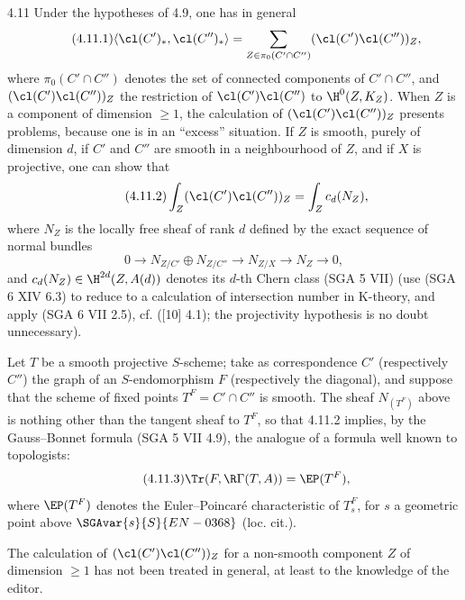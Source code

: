 \begin{statement}{4.11}
Under the hypotheses of 4.9, one has in general
\begin{equation}
\tag{4.11.1}
\langle \cl(C')_*,\cl(C'')_*\rangle
=
\sum_{Z\in\pi_0(C'\cap C'')}(\cl(C')\cl(C''))_Z,
\end{equation}
where $\pi_0(C'\cap C'')$ denotes the set of connected components of $C'\cap C''$, and $(\cl(C')\cl(C''))_Z$ the restriction of $\cl(C')\cl(C'')$ to $\H^0(Z,K_Z)$. When $Z$ is a component of dimension $\geq 1$, the calculation of $(\cl(C')\cl(C''))_Z$ presents problems, because one is in an ``excess'' situation. If $Z$ is smooth, purely of dimension $d$, if $C'$ and $C''$ are smooth in a neighbourhood of $Z$, and if $X$ is projective, one can show that
\begin{equation}
\tag{4.11.2}
\int_Z(\cl(C')\cl(C''))_Z=\int_Z c_d(N_Z),
\end{equation}
where $N_Z$ is the locally free sheaf of rank $d$ defined by the exact sequence of normal bundles
\[
0\longrightarrow N_{Z/C'}\oplus N_{Z/C''}\longrightarrow N_{Z/X}\longrightarrow N_Z\longrightarrow 0,
\]
and $c_d(N_Z)\in \H^{2d}(Z,A(d))$ denotes its $d$-th Chern class (SGA 5 VII) (use (SGA 6 XIV 6.3) to reduce to a calculation of intersection number in K-theory, and apply (SGA 6 VII 2.5), cf. ([10] 4.1); the projectivity hypothesis is no doubt unnecessary).

Let $T$ be a smooth projective $S$-scheme; take as correspondence $C'$ (respectively $C''$) the graph of an $S$-endomorphism $F$ (respectively the diagonal), and suppose that the scheme of fixed points $T^F=C'\cap C''$ is smooth. The sheaf $N_{(T^F)}$ above is nothing other than the tangent sheaf to $T^F$, so that 4.11.2 implies, by the Gauss--Bonnet formula (SGA 5 VII 4.9), the analogue of a formula well known to topologists:
\begin{equation}
\tag{4.11.3}
\Tr(F,\R\Gamma(T,A))=\EP(T^F),
\end{equation}
where $\EP(T^F)$ denotes the Euler--Poincaré characteristic of $T_s^F$, for $s$ a geometric point above $\SGAvar{s}{S}{EN-0368}$ (loc. cit.).
\end{statement}

The calculation of $(\cl(C')\cl(C''))_Z$ for a non-smooth component $Z$ of dimension $\geq 1$ has not been treated in general, at least to the knowledge of the editor.

